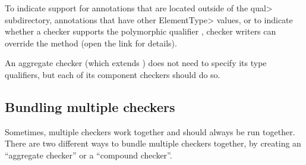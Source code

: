 To indicate support for annotations that are located outside of the \<qual>
subdirectory, annotations that have other \<ElementType> values, or to indicate
whether a checker supports the polymorphic qualifier
, checker writers can override the
method (open the link for details).

An aggregate checker (which extends
) does not need to specify its
type qualifiers, but each of its component checkers should do so.




\subsection{Bundling multiple checkers\label{bundling-multiple-checkers}}

Sometimes, multiple checkers work together and should always be run
together.  There are two different ways to bundle multiple checkers
together, by creating an ``aggregate checker'' or a ``compound checker''.


